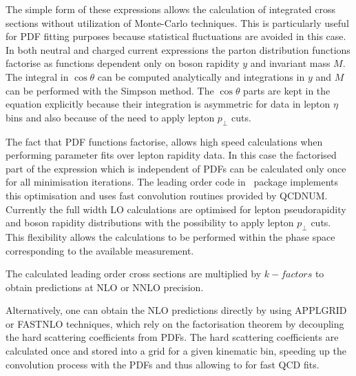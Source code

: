 The simple form of these expressions allows the calculation of integrated
cross sections without utilization of Monte-Carlo techniques.
This is particularly useful for PDF fitting purposes because
statistical fluctuations are avoided in this case. In both 
neutral and charged current expressions the parton distribution functions
factorise as functions dependent only on boson rapidity \(y\) and
invariant mass \(M\).
The integral in \(\cos\theta\) can be computed analytically and
integrations in \(y\) and \(M\) can be performed with the Simpson
method. The \(\cos\theta\) parts are kept in the equation 
explicitly because their integration is asymmetric for
data in lepton \(\eta\) bins and also because of the need to apply 
lepton \(p_{\perp}\) cuts.

The fact that PDF functions factorise, allows high speed calculations when 
performing parameter fits over lepton rapidity data. In this case
the factorised part of the expression which is independent of PDFs can be
calculated only once for all minimisation iterations.
The leading order code in \fitter\ package implements this 
optimisation and uses fast convolution routines provided by
QCDNUM. Currently the full width LO calculations are optimised 
for lepton pseudorapidity and boson rapidity distributions with the
possibility to apply lepton \(p_{\perp}\) cuts.
This flexibility allows the calculations to be performed within the phase space
corresponding to the available measurement.

The calculated leading order cross sections are multiplied by
$k-factors$ to obtain predictions at NLO or NNLO precision.

Alternatively, one can obtain the NLO predictions directly by using 
APPLGRID or FASTNLO techniques, which rely on the factorisation theorem by 
decoupling the hard scattering coefficients from PDFs.
The hard scattering coefficients are calculated once and stored into a grid 
for a given kinematic bin, speeding up the convolution process with the PDFs 
and thus allowing to for fast QCD fits. 

